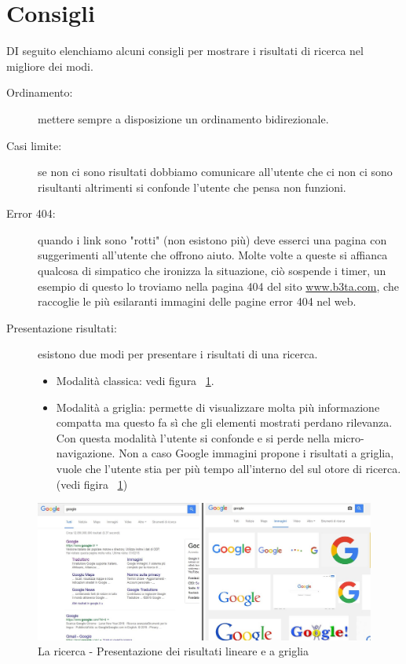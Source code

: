 	\section{Consigli}
		DI seguito elenchiamo alcuni consigli per mostrare i risultati di ricerca nel migliore dei modi.
		\begin{description}
			\item[Ordinamento:] mettere sempre a disposizione un ordinamento bidirezionale.
			\item[Casi limite:] se non ci sono risultati dobbiamo comunicare all'utente che ci non ci sono risultanti altrimenti si confonde l'utente che pensa non funzioni.
			\item[Error 404:] quando i link sono "rotti" (non esistono più) deve esserci una pagina con suggerimenti all'utente che offrono aiuto. Molte volte a queste si affianca qualcosa di simpatico che ironizza la situazione, ciò sospende i timer, un esempio di questo lo troviamo nella pagina 404 del sito \href{http://www.b3ta.com/error404}{www.b3ta.com}, che raccoglie le più esilaranti immagini delle pagine error 404 nel web.
			\item[Presentazione risultati:] esistono due modi per presentare i risultati di una ricerca.
				\begin{itemize}
					\item Modalità classica: vedi figura ~\ref{fig:LaRicerca-Consigli}.
					\item Modalità a griglia: permette di visualizzare molta più informazione compatta ma questo fa sì che gli elementi mostrati perdano rilevanza. Con questa modalità l'utente si confonde e si perde nella micro-navigazione. Non a caso Google immagini propone i risultati a griglia, vuole che l'utente stia per più tempo all'interno del sul otore di ricerca. (vedi figira ~\ref{fig:LaRicerca-Consigli})
				\end{itemize}
		\end{description}
		
		\begin{figure}
			\centering
			\includegraphics[width=\textwidth]{images/LaRicerca-Consigli}
			\caption[La ricerca - Tipi di presentazioni risultati]{La ricerca - Presentazione dei risultati lineare e a griglia}
			\label{fig:LaRicerca-Consigli}
		\end{figure}
		
